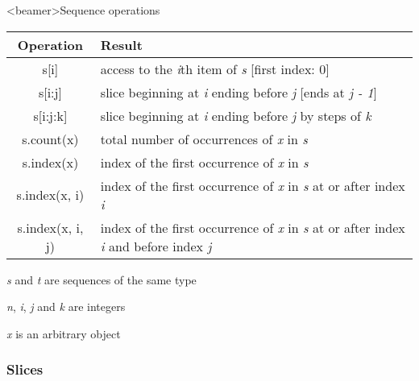 \begin{frame}<beamer>{Sequence operations}

  \begin{center}

%

  \begin{tabular}{| c | p{8.5cm} |}
    \hline
    \textbf{Operation} & \textbf{Result} \\
    \hline
    s[i] 		& access to the \textit{i}th item of \textit{s} [first index: 0] \\
    s[i:j] 		& slice beginning at \textit{i} ending before \textit{j} [ends at \textit{j - 1}] \\
    s[i:j:k] 	& slice beginning at \textit{i} ending before \textit{j} by steps of \textit{k} \\
    s.count(x) 		& total number of occurrences of \textit{x} in \textit{s} \\
    s.index(x) 			& index of the first occurrence of \textit{x} in \textit{s} \\
    s.index(x, i) 		& index of the first occurrence of \textit{x} in \textit{s} at or after index \textit{i} \\
    s.index(x, i, j) 	& index of the first occurrence of \textit{x} in \textit{s} at or after index \textit{i} and before index \textit{j} \\
    \hline
  \end{tabular}



  \medskip

  \textit{s} and \textit{t} are sequences of the same type

  \textit{n}, \textit{i}, \textit{j} and \textit{k} are integers

  \textit{x} is an arbitrary object

  \end{center}

\end{frame}


\subsubsection{Slices}


